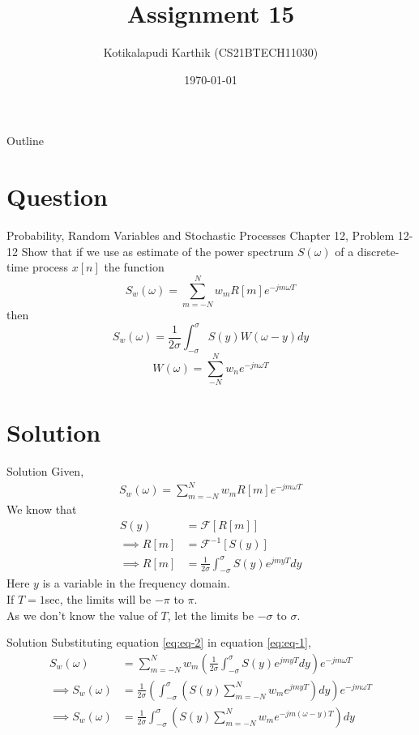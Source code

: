 \documentclass{beamer}
\title{Assignment 15}
\author{Kotikalapudi Karthik (CS21BTECH11030)}
\date{\today}
\providecommand{\sbrak}[1]{\ensuremath{{}\left[#1\right]}}
\providecommand{\brak}[1]{\ensuremath{\left(#1\right)}}
\begin{document}
\begin{frame}
    \titlepage 
\end{frame}

\logo{}


\begin{frame}{Outline}
    \tableofcontents
\end{frame}
\section{Question}
\begin{frame}{Probability, Random Variables and Stochastic Processes Chapter 12, Problem 12-12}
    Show that if we use as estimate of the power spectrum $S\brak{\omega}$ of a discrete-time process $x[n]$ the function
    $$S_w\brak{\omega} = \sum_{m=-N}^{N}w_m R\sbrak{m}e^{-jm\omega T}$$
    then 
    $$S_w\brak{\omega}=\frac{1}{2\sigma}\int_{-\sigma}^{\sigma}S\brak{y}W\brak{\omega-y}dy$$ $$W\brak{\omega}=\sum^{N}_{-N}w_ne^{-jn\omega T}$$
\end{frame}

\section{Solution}
\begin{frame}{Solution}
    Given,
    \begin{align}
        S_w\brak{\omega} = \sum_{m=-N}^{N}w_m R\sbrak{m}e^{-jm\omega T}
        \label{eq:eq-1}
    \end{align}
    We know that
    \begin{align}
        S\brak{y} &= \mathcal{F}\sbrak{R\sbrak{m}}
        \\
        \implies R\sbrak{m} &= \mathcal{F}^{-1}\sbrak{S\brak{y}}
        \\
        \implies R\sbrak{m} &= \frac{1}{2\sigma}\int^{\sigma}_{-\sigma}S\brak{y}e^{jmyT}dy
        \label{eq:eq-2}
    \end{align}
    Here $y$ is a variable in the frequency domain.\\
    If $T=1$sec, the limits will be $-\pi$ to $\pi$.\\
    As we don't know the value of $T$, let the limits be $-\sigma$ to $\sigma$.
\end{frame}
\begin{frame}{Solution}
    Substituting equation \eqref{eq:eq-2} in equation \eqref{eq:eq-1},
    \begin{align}
        S_w\brak{\omega} &= \sum_{m=-N}^{N}w_m \brak{\frac{1}{2\sigma}\int^{\sigma}_{-\sigma}S\brak{y}e^{jmyT}dy}e^{-jm\omega T}
        \\
        \implies S_w\brak{\omega} &= \frac{1}{2\sigma} \brak{\int^{\sigma}_{-\sigma}\brak{S\brak{y}\sum_{m=-N}^{N}w_me^{jmyT}}dy}e^{-jm\omega T}
        \\
        \implies S_w\brak{\omega} &= \frac{1}{2\sigma} \int^{\sigma}_{-\sigma}\brak{S\brak{y}\sum_{m=-N}^{N}w_me^{-jm(\omega-y)T}}dy
        \label{eq:eq-3}
    \end{align}
    
\end{frame}
\end{document}
